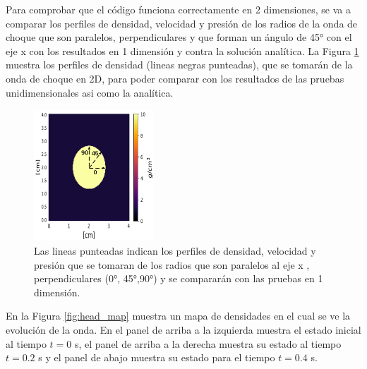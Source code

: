 \documentclass[12pt,a4paper]{book}
\begin{document}
Para comprobar que el código funciona correctamente en 2 dimensiones, se va a comparar los perfiles de densidad, velocidad y presión de los radios de la onda de choque que son  paralelos, perpendiculares y que forman un ángulo de 45° con el eje x con los resultados en 1 dimensión
y contra la solución analítica. 
La Figura \ref{Example_blast_wave} muestra los perfiles de densidad (lineas negras punteadas),
que se tomarán de la onda de choque en 2D, para poder comparar con los resultados de las pruebas unidimensionales 
asi como la analítica.

\begin{figure}
  \centering
    \includegraphics[width=0.4\textwidth]{./Figuras/verificacion_del_codigo/pruebas_2D/Example.png}
  \caption{Las lineas punteadas indican los perfiles de densidad, velocidad y presión que se 
  tomaran de los radios que son 
  paralelos al eje x ,  perpendiculares (0°, 45°,90°) y se compararán con las pruebas en 
  1 dimensión.}\label{Example_blast_wave}
\end{figure}

En la Figura \ref{fig:head_map} muestra un mapa de densidades en el cual se ve la
evolución de la onda. En el panel de arriba a la izquierda muestra el estado inicial al tiempo $t = 0$ s, el panel
de arriba a la derecha muestra su estado al tiempo $t = 0.2$ s y el panel de abajo muestra su estado para
el tiempo $t = 0.4$ s.
\end{document}
